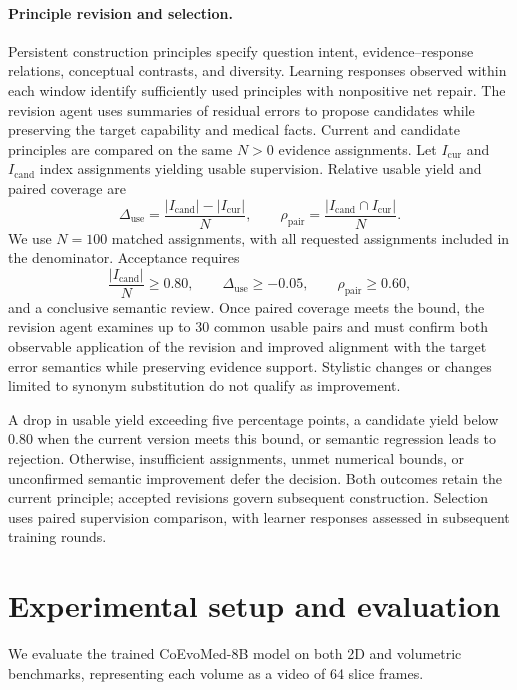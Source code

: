 \paragraph{Principle revision and selection.}
Persistent construction principles specify question intent, evidence--response relations, conceptual contrasts, and diversity. Learning responses observed within each window identify sufficiently used principles with nonpositive net repair. The revision agent uses summaries of residual errors to propose candidates while preserving the target capability and medical facts. Current and candidate principles are compared on the same $N>0$ evidence assignments. Let $I_{\mathrm{cur}}$ and $I_{\mathrm{cand}}$ index assignments yielding usable supervision. Relative usable yield and paired coverage are
\begin{equation}
\Delta_{\mathrm{use}}=\frac{|I_{\mathrm{cand}}|-|I_{\mathrm{cur}}|}{N},
\qquad
\rho_{\mathrm{pair}}=\frac{|I_{\mathrm{cand}}\cap I_{\mathrm{cur}}|}{N}.
\label{eq:strategy_comparison}
\end{equation}
We use $N=100$ matched assignments, with all requested assignments included in the denominator. Acceptance requires
\[
\frac{|I_{\mathrm{cand}}|}{N}\geq0.80,\qquad
\Delta_{\mathrm{use}}\geq-0.05,\qquad
\rho_{\mathrm{pair}}\geq0.60,
\]
and a conclusive semantic review. Once paired coverage meets the bound, the revision agent examines up to 30 common usable pairs and must confirm both observable application of the revision and improved alignment with the target error semantics while preserving evidence support. Stylistic changes or changes limited to synonym substitution do not qualify as improvement.

A drop in usable yield exceeding five percentage points, a candidate yield below 0.80 when the current version meets this bound, or semantic regression leads to rejection. Otherwise, insufficient assignments, unmet numerical bounds, or unconfirmed semantic improvement defer the decision. Both outcomes retain the current principle; accepted revisions govern subsequent construction. Selection uses paired supervision comparison, with learner responses assessed in subsequent training rounds.

\section{Experimental setup and evaluation}
\label{app:evaluation}
\label{app:3d}

We evaluate the trained CoEvoMed-8B model on both 2D and volumetric benchmarks, representing each volume as a video of 64 slice frames.

